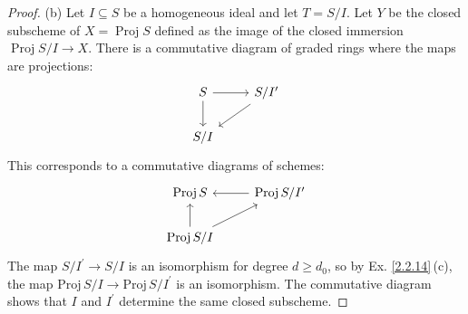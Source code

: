 \documentclass[12pt]{amsart}
\begin{document}
\begin{proof}
	(b) Let $I \subseteq S$ be a homogeneous ideal and let $T=S / I $. Let $Y$ be the closed subscheme of $X=\operatorname{Proj} S$ defined as the image of the closed immersion $\operatorname{Proj} S / I \rightarrow X $. There is a commutative diagram of graded rings where the maps are projections:
	\begin{equation*}
		\begin{tikzcd}
		S \arrow[d] \arrow[r] & S / I^{\prime} \arrow[ld] \\
		S / I                 &                          
		\end{tikzcd}
	\end{equation*}
	This corresponds to a commutative diagrams of schemes:
	\begin{equation*}
		\begin{tikzcd}
		\operatorname{Proj} S                     & \operatorname{Proj} S / I^{\prime} \arrow[l] \\
		\operatorname{Proj} S / I \arrow[u] \arrow[ru] &                                             
		\end{tikzcd}
	\end{equation*}
	The map $S / I^{\prime} \rightarrow S / I$ is an isomorphism for degree $d \geq d_{0}$, so by Ex. \ref{2.2.14}\,(c), the map $\mathrm{Proj}\,S / I \rightarrow \mathrm{Proj}\, S / I^{\prime}$ is an isomorphism. The commutative diagram shows that $I$ and $I^{\prime}$ determine the same closed subscheme.
\end{proof}
\end{document}
